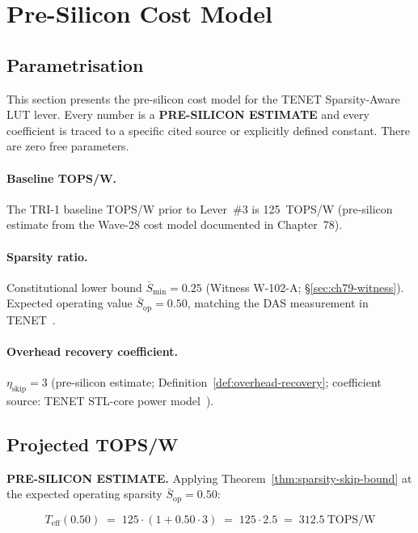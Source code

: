 \section{Pre-Silicon Cost Model}
\label{sec:ch79-cost-model}

\subsection{Parametrisation}
\label{subsec:ch79-cost-parametrisation}

This section presents the pre-silicon cost model for the TENET
Sparsity-Aware LUT lever.
Every number is a \textbf{PRE-SILICON ESTIMATE} and every coefficient
is traced to a specific cited source or explicitly defined constant.
There are zero free parameters.

\paragraph{Baseline TOPS/W.}
The TRI-1 baseline TOPS/W prior to Lever~\#3 is 125~TOPS/W
(pre-silicon estimate from the Wave-28 cost model documented in
Chapter~78).

\paragraph{Sparsity ratio.}
Constitutional lower bound $\bar{S}_{\min} = 0.25$
(Witness W-102-A; §\ref{sec:ch79-witness}).
Expected operating value $\bar{S}_{\mathrm{op}} = 0.50$,
matching the DAS measurement in TENET~\cite{huang2025tenet}.

\paragraph{Overhead recovery coefficient.}
$\eta_{\mathrm{skip}} = 3$
(pre-silicon estimate; Definition~\ref{def:overhead-recovery};
coefficient source: TENET STL-core power model~\cite{huang2025tenet}).

\subsection{Projected TOPS/W}
\label{subsec:ch79-tops-w-projection}

\textbf{PRE-SILICON ESTIMATE.}
Applying Theorem~\ref{thm:sparsity-skip-bound} at the expected
operating sparsity $\bar{S}_{\mathrm{op}} = 0.50$:

\[
  T_{\mathrm{eff}}(0.50) \;=\; 125 \cdot (1 + 0.50 \cdot 3)
    \;=\; 125 \cdot 2.5 \;=\; 312.5~\text{TOPS/W}
\]

